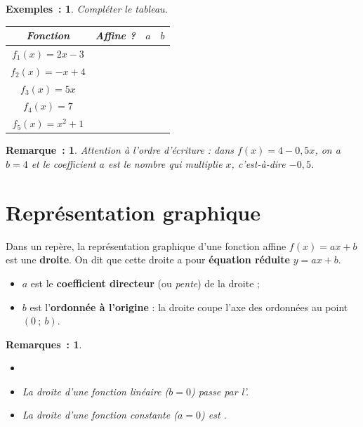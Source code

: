 \documentclass[12pt]{article}
\theoremstyle{break}
\newtheorem*{examples}{Exemples~:}
\newtheorem*{remark}{Remarque~:}
\newtheorem*{remarks}{Remarques~:}
\theoremstyle{inline}
\begin{document}
\begin{examples}
  Compléter le tableau.

  \renewcommand{\arraystretch}{1.6}
  \begin{center}
  \begin{tabularx}{\linewidth}{|c|Y|Y|Y|}
    \hline
    Fonction & Affine ? & $a$ & $b$ \\
    \hline
    $f_1(x) = 2x - 3$ &  &  &  \\
    \hline
    $f_2(x) = -x + 4$ &  &  &  \\
    \hline
    $f_3(x) = 5x$ &  &  &  \\
    \hline
    $f_4(x) = 7$ &  &  &  \\
    \hline
    $f_5(x) = x^2 + 1$ &  & & \\
    \hline
  \end{tabularx}
  \end{center}
\end{examples}

\begin{remark}
  Attention à l'ordre d'écriture : dans $f(x) = 4 - 0{,}5x$, on a $b = 4$ et le coefficient $a$ est le nombre qui multiplie $x$, c'est-à-dire $-0{,}5$.
\end{remark}

\newpage
\section{Représentation graphique}

\begin{proposition}{}{}
  \begin{multihide}
    Dans un repère, la représentation graphique d'une fonction affine $f(x) = ax + b$ est une \textbf{droite}.
    On dit que cette droite a pour \textbf{équation réduite} $y = ax + b$.
    \begin{itemize}
      \item $a$ est le \textbf{coefficient directeur} (ou \emph{pente}) de la droite ;
      \item $b$ est l'\textbf{ordonnée à l'origine} : la droite coupe l'axe des ordonnées au point $(0~;~b)$.
    \end{itemize}
  \end{multihide}
\end{proposition}

\begin{remarks}
  \begin{itemize}
    \item[]
    \item La droite d'une fonction linéaire ($b = 0$) passe par l'.
    \item La droite d'une fonction constante ($a = 0$) est .
  \end{itemize}
\end{remarks}
\end{document}
